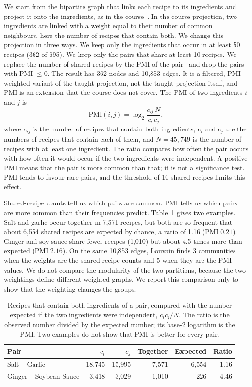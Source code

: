 We start from the bipartite graph that links each recipe to its ingredients
and project it onto the ingredients, as in the course~\cite{quercini2026}. In
the course projection, two ingredients are linked with a weight equal to
their number of common neighbours, here the number of recipes that contain
both. We change this projection in three ways. We keep only the ingredients
that occur in at least 50 recipes (362 of 695). We keep only the pairs that
share at least 10 recipes. We replace the number of shared recipes by the PMI
of the pair~\cite{church1990} and drop the pairs with PMI $\leq 0$. The result
has 362 nodes and 10{,}853 edges. It is a filtered, PMI-weighted variant of
the taught projection, not the taught projection itself, and PMI is an
extension that the course does not cover. The PMI of two ingredients $i$ and
$j$ is
\begin{equation*}
  \mathrm{PMI}(i,j) = \log_2 \frac{c_{ij}\, N}{c_i\, c_j},
\end{equation*}
where $c_{ij}$ is the number of recipes that contain both ingredients, $c_i$
and $c_j$ are the numbers of recipes that contain each of them, and
$N=45{,}749$ is the number of recipes with at least one ingredient. The
ratio compares how often the pair occurs with how often it would occur if the
two ingredients were independent. A positive PMI means that the pair is more
common than that; it is not a significance test. PMI tends to favour rare
pairs, and the threshold of 10 shared recipes limits this effect.

Shared-recipe counts tell us which pairs are common. PMI tells us which pairs
are more common than their frequencies predict. Table~\ref{tab:pmi} gives two
examples. Salt and garlic occur together in 7{,}571 recipes, but both are so
frequent that about 6{,}554 shared recipes are expected by chance, a ratio of
1.16 (PMI $0.21$). Ginger and soy sauce share fewer recipes (1{,}010) but
about 4.5 times more than expected (PMI $2.16$). On the same 10{,}853 edges,
Louvain finds 3 communities when the weights are the shared-recipe counts and
5 when they are the PMI values. We do not compare the modularity of the two
partitions, because the two weightings define different weighted graphs. We
report this comparison only to show that the weighting changes the groups.

\begin{table}[h]
\centering
\small
\begin{tabular}{@{}l r r r r r@{}}
\toprule
Pair & $c_i$ & $c_j$ & Together & Expected & Ratio \\
\midrule
Salt -- Garlic & 18{,}745 & 15{,}995 & 7{,}571 & 6{,}554 & 1.16 \\
Ginger -- Soybean Sauce & 3{,}418 & 3{,}029 & 1{,}010 & 226 & 4.46 \\
\bottomrule
\end{tabular}
\caption{Recipes that contain both ingredients of a pair, compared with the
number expected if the two ingredients were independent, $c_i c_j / N$. The
ratio is the observed number divided by the expected number; its base-2
logarithm is the PMI. Two examples do not show that PMI is better for every
pair.}
\label{tab:pmi}
\end{table}

